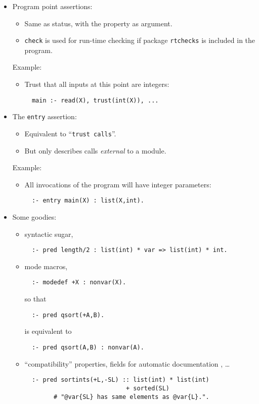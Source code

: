 \documentclass{article}
\renewcommand{\_}{\char'137}
\begin{document}
\begin{itemize}
\item Program point assertions: 
\begin{itemize}
\item Same as status, with the property as argument.
\item {\tt check} is used for run-time checking if package
  \verb+rtchecks+ is included in the program.
\end{itemize}

Example:
\begin{itemize}
\item Trust that all inputs at this point are integers:
\begin{verbatim}
  main :- read(X), trust(int(X)), ...
\end{verbatim}
\end{itemize}

\item The {\tt entry} assertion:
\begin{itemize}
\item Equivalent to ``{\tt trust calls}''.
\item But only describes calls {\em external} to a module.
\end{itemize}

Example:
\begin{itemize}
\item All invocations of the program will have integer parameters:
\begin{verbatim}
  :- entry main(X) : list(X,int).
\end{verbatim}
\end{itemize}

\item Some goodies:
\begin{itemize}
\item syntactic sugar,
\begin{verbatim}
  :- pred length/2 : list(int) * var => list(int) * int.
\end{verbatim}
\item mode macros, 
\begin{verbatim}
  :- modedef +X : nonvar(X).
\end{verbatim}
so that
\begin{verbatim}
  :- pred qsort(+A,B).
\end{verbatim}
is equivalent to
\begin{verbatim}
  :- pred qsort(A,B) : nonvar(A).
\end{verbatim}
\item ``compatibility''  properties, fields for automatic
  documentation \cite{ciaodoc-tr}, \ldots 
\begin{verbatim}
  :- pred sortints(+L,-SL) :: list(int) * list(int) 
                            + sorted(SL)
        # "@var{SL} has same elements as @var{L}.".
\end{verbatim}
\end{itemize}

\end{itemize}
\end{document}
